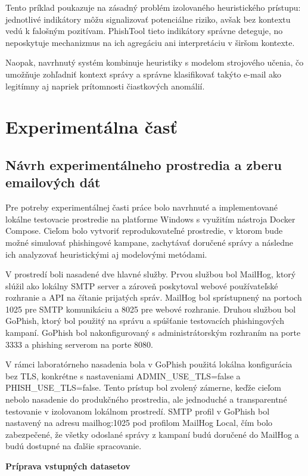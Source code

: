 \documentclass[conference]{IEEEtran}
\begin{document}
Tento príklad poukazuje na zásadný problém izolovaného heuristického
prístupu: jednotlivé indikátory môžu signalizovať potenciálne riziko,
avšak bez kontextu vedú k falošným pozitívam. PhishTool tieto indikátory
správne deteguje, no neposkytuje mechanizmus na ich agregáciu ani
interpretáciu v širšom kontexte.

Naopak, navrhnutý systém kombinuje heuristiky s modelom strojového učenia,
čo umožňuje zohľadniť kontext správy a správne klasifikovať takýto e-mail
ako legitímny aj napriek prítomnosti čiastkových anomálií.

\section{Experimentálna časť}
\subsection{Návrh experimentálneho prostredia a zberu emailových dát}
Pre potreby experimentálnej časti práce bolo navrhnuté a implementované lokálne testovacie prostredie na platforme Windows s využitím nástroja Docker Compose. Cieľom bolo vytvoriť reprodukovateľné prostredie, v ktorom bude možné simulovať phishingové kampane, zachytávať doručené správy a následne ich analyzovať heuristickými aj modelovými metódami.

V prostredí boli nasadené dve hlavné služby. Prvou službou bol MailHog, ktorý slúžil ako lokálny SMTP server a zároveň poskytoval webové používateľské rozhranie a API na čítanie prijatých správ. MailHog bol sprístupnený na portoch 1025 pre SMTP komunikáciu a 8025 pre webové rozhranie. Druhou službou bol GoPhish, ktorý bol použitý na správu a spúšťanie testovacích phishingových kampaní. GoPhish bol nakonfigurovaný s administrátorským rozhraním na porte 3333 a phishing serverom na porte 8080.

V rámci laboratórneho nasadenia bola v GoPhish použitá lokálna konfigurácia bez TLS, konkrétne s nastaveniami ADMIN\_USE\_TLS=false a PHISH\_USE\_TLS=false. Tento prístup bol zvolený zámerne, keďže cieľom nebolo nasadenie do produkčného prostredia, ale jednoduché a transparentné testovanie v izolovanom lokálnom prostredí. SMTP profil v GoPhish bol nastavený na adresu mailhog:1025 pod profilom MailHog Local, čím bolo zabezpečené, že všetky odoslané správy z kampaní budú doručené do MailHog a budú dostupné na ďalšie spracovanie.

\textbf{Príprava vstupných datasetov}
\end{document}
